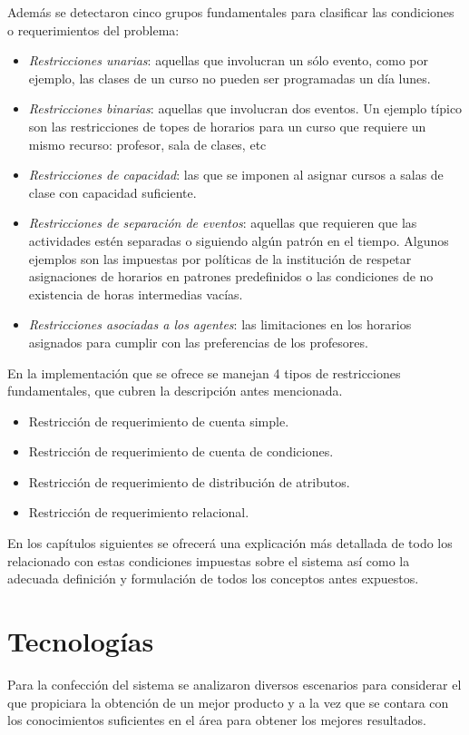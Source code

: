 Además se detectaron cinco grupos fundamentales para clasificar las condiciones o requerimientos del problema:
\begin{itemize}
	\item \textit{Restricciones unarias}: aquellas que involucran un sólo evento, como por ejemplo, las clases de un curso no pueden ser programadas un día lunes.
	\item \textit{Restricciones binarias}: aquellas que involucran dos eventos. Un ejemplo típico son las restricciones de topes de horarios para un curso que requiere un mismo recurso: profesor, sala de clases, etc
	\item \textit {Restricciones de capacidad}: las que se imponen al asignar cursos a salas de clase con capacidad suficiente.
	\item \textit{Restricciones de separación de eventos}:  aquellas que requieren que las actividades estén separadas o siguiendo algún patrón en el tiempo. Algunos ejemplos son las impuestas por políticas de la institución de respetar asignaciones de horarios en patrones predefinidos o las condiciones de no existencia de horas intermedias vacías.
	\item \textit{Restricciones asociadas a los  agentes}: las limitaciones en los horarios asignados para cumplir con las preferencias de los profesores.
\end{itemize}

En la implementación que se ofrece se manejan 4 tipos de restricciones fundamentales, que cubren la descripción antes mencionada.
\begin{itemize}
	\item Restricción de requerimiento de cuenta simple.
	\item Restricción de requerimiento de cuenta de condiciones.
	\item Restricción de requerimiento de distribución de atributos.
	\item Restricción de requerimiento relacional.
\end{itemize}
En los capítulos siguientes se ofrecerá una explicación más detallada de todo los relacionado con estas condiciones impuestas sobre el sistema así como la adecuada definición y formulación de todos los conceptos antes expuestos.

\section{Tecnologías}
Para la confección del sistema se analizaron diversos escenarios para considerar el que propiciara la obtención de un mejor producto y a la vez que se contara con los conocimientos suficientes en el área para obtener los mejores resultados. 

